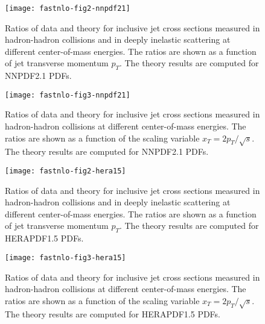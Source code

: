 \documentclass[11pt]{article}
\begin{document}
\begin{figure}
  \centerline{
\texttt{[image: fastnlo-fig2-nnpdf21]}%
}
\caption{\label{fig:incljets-nnpdf}
Ratios of data and theory for inclusive jet cross sections
measured in hadron-hadron collisions and in deeply inelastic scattering
at different center-of-mass energies.
The ratios are shown as a function of jet transverse momentum $p_T$.
The theory results are computed for NNPDF2.1 PDFs.}
\end{figure}

\begin{figure}
  \centerline{
\texttt{[image: fastnlo-fig3-nnpdf21]}%
}
\caption{\label{fig:ppjetsxt-nnpdf}
Ratios of data and theory for inclusive jet cross sections
measured in hadron-hadron collisions
at different center-of-mass energies.
The ratios are shown as a function of the scaling variable
$x_T = 2p_T/\sqrt{s}$.
The theory results are computed for NNPDF2.1 PDFs.}
\end{figure}

\begin{figure}
  \centerline{
\texttt{[image: fastnlo-fig2-hera15]}%
}
\caption{\label{fig:incljets-hera}
Ratios of data and theory for inclusive jet cross sections
measured in hadron-hadron collisions and in deeply inelastic scattering
at different center-of-mass energies.
The ratios are shown as a function of jet transverse momentum $p_T$.
The theory results are computed for HERAPDF1.5 PDFs.
}
\end{figure}

\begin{figure}
  \centerline{
\texttt{[image: fastnlo-fig3-hera15]}%
}
\caption{\label{fig:ppjetsxt-hera}
Ratios of data and theory for inclusive jet cross sections
measured in hadron-hadron collisions
at different center-of-mass energies.
The ratios are shown as a function of the scaling variable
$x_T = 2p_T/\sqrt{s}$.
The theory results are computed for HERAPDF1.5 PDFs.
}
\end{figure}
\end{document}
